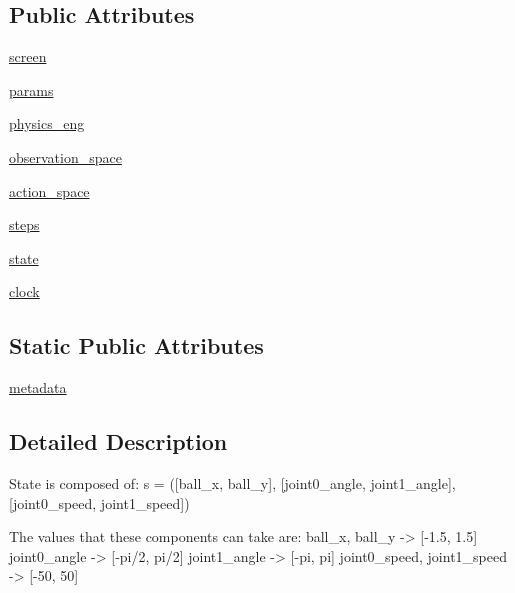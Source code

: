 \subsection*{Public Attributes}
\begin{DoxyCompactItemize}
\item 
\hyperlink{classtaxons_1_1gym__billiard_1_1envs_1_1billiard__env_1_1_billiard_env_a4a1c8260de7230376cd855374033937c}{screen}
\item 
\hyperlink{classtaxons_1_1gym__billiard_1_1envs_1_1billiard__env_1_1_billiard_env_a54f53f6e892fcdbb5b765932374fc530}{params}
\item 
\hyperlink{classtaxons_1_1gym__billiard_1_1envs_1_1billiard__env_1_1_billiard_env_a6d670e52ddfbaaf3553d8323c4a86180}{physics\+\_\+eng}
\item 
\hyperlink{classtaxons_1_1gym__billiard_1_1envs_1_1billiard__env_1_1_billiard_env_a080c4cf436a62ab8dd3aacaea6adae3e}{observation\+\_\+space}
\item 
\hyperlink{classtaxons_1_1gym__billiard_1_1envs_1_1billiard__env_1_1_billiard_env_aca17d35df853b794e5187c14760023fe}{action\+\_\+space}
\item 
\hyperlink{classtaxons_1_1gym__billiard_1_1envs_1_1billiard__env_1_1_billiard_env_ad5b8c9811dd9a5c6c9eaa44f576f11b1}{steps}
\item 
\hyperlink{classtaxons_1_1gym__billiard_1_1envs_1_1billiard__env_1_1_billiard_env_a3759e742c0d0c4675b30c145da6de33c}{state}
\item 
\hyperlink{classtaxons_1_1gym__billiard_1_1envs_1_1billiard__env_1_1_billiard_env_a9aed5275af97b0fc8a116bb09ed7f811}{clock}
\end{DoxyCompactItemize}
\subsection*{Static Public Attributes}
\begin{DoxyCompactItemize}
\item 
\hyperlink{classtaxons_1_1gym__billiard_1_1envs_1_1billiard__env_1_1_billiard_env_a2e6c94ce74451c211285b031c83909a6}{metadata}
\end{DoxyCompactItemize}


\subsection{Detailed Description}
\begin{DoxyVerb}State is composed of:
s = ([ball_x, ball_y], [joint0_angle, joint1_angle], [joint0_speed, joint1_speed])

The values that these components can take are:
ball_x, ball_y -> [-1.5, 1.5]
joint0_angle -> [-pi/2, pi/2]
joint1_angle -> [-pi, pi]
joint0_speed, joint1_speed -> [-50, 50]
\end{DoxyVerb}
 

